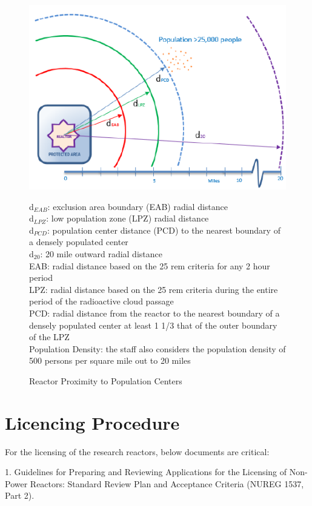 \documentclass[10pt,a4paper]{article}
\begin{document}
\begin{figure}[hbtp]
\centering
\includegraphics[scale=0.7]{Figs/reactorproximity.jpeg}
\caption{Reactor Proximity to Population Centers}
\label{rprox}

\flushleft
d$_{EAB}$: exclusion area boundary (EAB) radial distance\\
d$_{LPZ}$: low population zone (LPZ) radial distance\\
d$_{PCD}$: population center distance (PCD) to the nearest boundary of a densely populated center\\
d$_{20}$: 20 mile outward radial distance \\
EAB: radial distance based on the 25 rem criteria for any 2 hour period\\
LPZ: radial distance based on the 25 rem criteria during the entire period of the radioactive cloud passage\\
PCD: radial distance from the reactor to the nearest boundary of a densely populated center at least 1 1/3 that of the outer boundary of the LPZ\\
Population Density: the staff also considers the population density of 500 persons per square mile out to 20 miles
\end{figure} 

\pagebreak


\pagebreak
\section{Licencing Procedure}
For the licensing of the research reactors, below documents are critical:

1. Guidelines for Preparing and Reviewing Applications for the Licensing of Non-Power Reactors: Standard Review Plan and Acceptance Criteria (NUREG 1537, Part 2).
\end{document}

